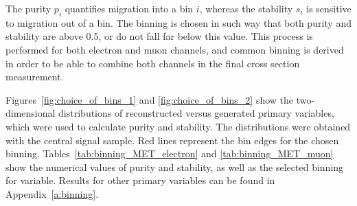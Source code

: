 The purity $p_i$ quantifies migration into a bin $i$, whereas the stability $s_i$ is sensitive to migration out of a
bin. The binning is chosen in such way that both purity and stability are above \num{0.5}, or do not fall far below this
value. This process is performed for both electron and muon channels, and common binning is derived in order to be able
to combine both channels in the final cross section measurement.

Figures~\ref{fig:choice_of_bins_1} and \ref{fig:choice_of_bins_2} show the two-dimensional distributions of
reconstructed versus generated primary variables, which were used to calculate purity and stability. The distributions
were obtained with the central signal \ttbar sample. Red lines represent the bin edges for the chosen binning.
Tables~\ref{tab:binning_MET_electron} and \ref{tab:binning_MET_muon} show the numerical values of purity and stability,
as well as the selected binning for \MET variable. Results for other primary variables can be found in
Appendix~\ref{a:binning}.



